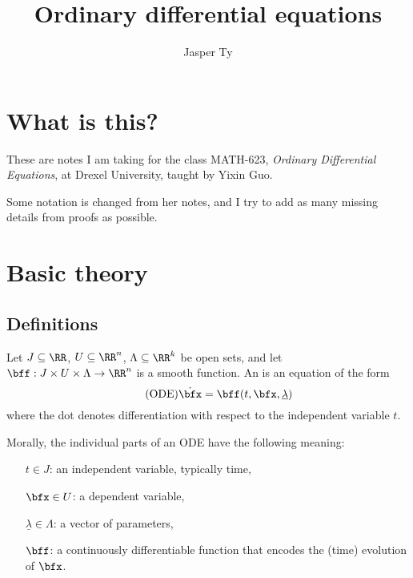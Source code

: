 \documentclass{article}
\title{Ordinary differential equations}
\author{Jasper Ty}
\date{}
\newcommand*\ullam{\underline{\lambda}}
\begin{document}
\maketitle

\section*{What is this?}

These are notes I am taking for the class MATH-623, \textit{Ordinary Differential Equations}, at Drexel University, taught by Yixin Guo.

Some notation is changed from her notes, and I try to add as many missing details from proofs as possible.

\tableofcontents

\newpage

\section{Basic theory}

\subsection{Definitions}

\begin{definition}
    Let $J \subseteq \RR$, $U \subseteq \RR^n$, $\Lambda \subseteq \RR^k$ be open sets, and let $\bff: J \times U \times \Lambda \to \RR^n$ is a smooth function.
    An  is an equation of the form 
    \begin{equation}
        \label{eqn:ODE}
        \tag{ODE}
        \dot{\bfx}
        =
        \bff(t, \bfx, \ullam)
    \end{equation}
    where the dot denotes differentiation with respect to the independent variable $t$.
\end{definition}

Morally, the individual parts of an ODE have the following meaning:
\begin{itemize}
    \item[$t \in J$:]
        an independent variable, typically time,
    \item [$\bfx \in U$:]
        a dependent variable,
    \item[$\ullam \in \Lambda$:]
        a vector of parameters, 
    \item[$\bff$:]
        a continuously differentiable function that encodes the (time) evolution of $\bfx$.
\end{itemize}
\end{document}
